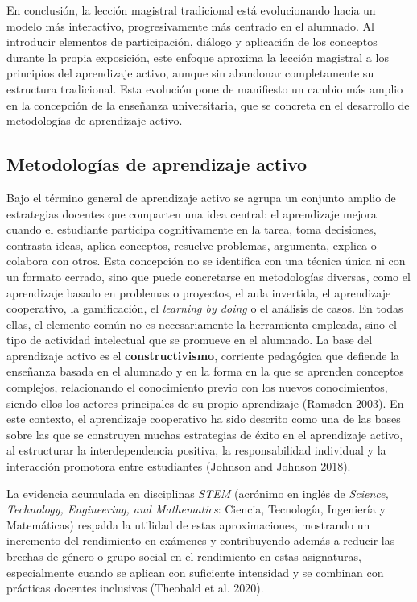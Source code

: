 \documentclass[
  11pt,
  a4paper,
  twoside]{scrreprt}
\begin{document}
En conclusión, la lección magistral tradicional está evolucionando hacia
un modelo más interactivo, progresivamente más centrado en el alumnado.
Al introducir elementos de participación, diálogo y aplicación de los
conceptos durante la propia exposición, este enfoque aproxima la lección
magistral a los principios del aprendizaje activo, aunque sin abandonar
completamente su estructura tradicional. Esta evolución pone de
manifiesto un cambio más amplio en la concepción de la enseñanza
universitaria, que se concreta en el desarrollo de metodologías de
aprendizaje activo.

\subsection{Metodologías de aprendizaje
activo}\label{metodologuxedas-de-aprendizaje-activo}

Bajo el término general de aprendizaje activo se agrupa un conjunto
amplio de estrategias docentes que comparten una idea central: el
aprendizaje mejora cuando el estudiante participa cognitivamente en la
tarea, toma decisiones, contrasta ideas, aplica conceptos, resuelve
problemas, argumenta, explica o colabora con otros. Esta concepción no
se identifica con una técnica única ni con un formato cerrado, sino que
puede concretarse en metodologías diversas, como el aprendizaje basado
en problemas o proyectos, el aula invertida, el aprendizaje cooperativo,
la gamificación, el \emph{learning by doing} o el análisis de casos. En
todas ellas, el elemento común no es necesariamente la herramienta
empleada, sino el tipo de actividad intelectual que se promueve en el
alumnado. La base del aprendizaje activo es el \textbf{constructivismo},
corriente pedagógica que defiende la enseñanza basada en el alumnado y
en la forma en la que se aprenden conceptos complejos, relacionando el
conocimiento previo con los nuevos conocimientos, siendo ellos los
actores principales de su propio aprendizaje (Ramsden 2003). En este
contexto, el aprendizaje cooperativo ha sido descrito como una de las
bases sobre las que se construyen muchas estrategias de éxito en el
aprendizaje activo, al estructurar la interdependencia positiva, la
responsabilidad individual y la interacción promotora entre estudiantes
(Johnson and Johnson 2018).

La evidencia acumulada en disciplinas \emph{STEM} (acrónimo en inglés de
\emph{Science, Technology, Engineering, and Mathematics}: Ciencia,
Tecnología, Ingeniería y Matemáticas) respalda la utilidad de estas
aproximaciones, mostrando un incremento del rendimiento en exámenes y
contribuyendo además a reducir las brechas de género o grupo social en
el rendimiento en estas asignaturas, especialmente cuando se aplican con
suficiente intensidad y se combinan con prácticas docentes inclusivas
(Theobald et al. 2020).
\end{document}
